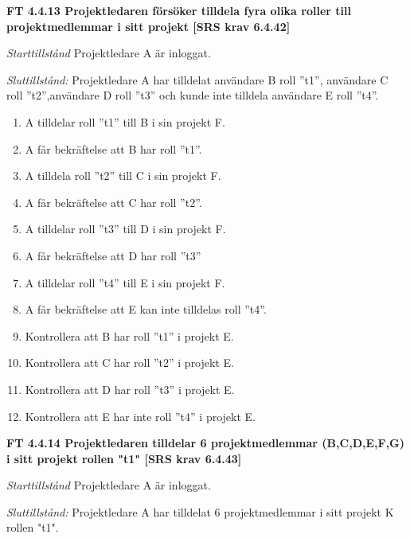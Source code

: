 \documentclass[a4paper]{article}
\begin{document}
\textbf{FT 4.4.13 Projektledaren försöker tilldela fyra olika roller till projektmedlemmar i sitt projekt [SRS krav 6.4.42]}

\emph{Starttillstånd} Projektledare A är inloggat.

\emph{Sluttillstånd:} Projektledare A  har tilldelat användare B roll ”t1”, användare C roll ”t2”,användare D roll ”t3” och kunde inte tilldela användare E roll ”t4”.

\begin{enumerate}
\item A tilldelar roll ”t1” till B i sin projekt F.
\item A får bekräftelse att  B har roll ”t1”.
\item A tilldela roll ”t2” till C i sin projekt F.
\item A får bekräftelse att C har roll ”t2”.
\item A tilldelar roll ”t3” till D i sin projekt F.
\item A får bekräftelse att D har roll ”t3”
\item A tilldelar roll ”t4” till E i sin projekt F.
\item A får bekräftelse att E kan inte tilldelas roll ”t4”.
\item Kontrollera att B har roll ”t1” i projekt E.
\item Kontrollera att C har roll ”t2” i projekt E.
\item Kontrollera att D har roll ”t3” i projekt E.
\item Kontrollera att E har inte roll ”t4” i projekt E.
\end{enumerate}

\textbf{FT 4.4.14 Projektledaren tilldelar 6 projektmedlemmar (B,C,D,E,F,G) i sitt projekt rollen "t1" [SRS krav 6.4.43]}

\emph{Starttillstånd} Projektledare A är inloggat.

\emph{Sluttillstånd:} Projektledare A  har tilldelat 6 projektmedlemmar i sitt projekt K  rollen "t1".
\end{document}
